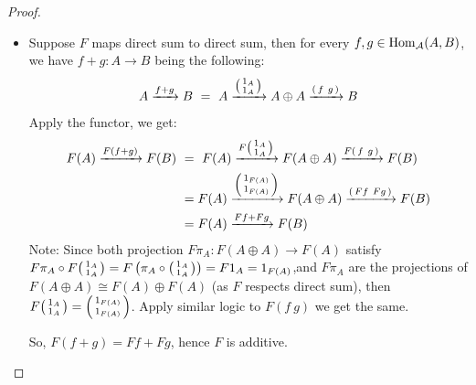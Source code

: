 \documentclass{article}
\begin{document}
\begin{proof}
\begin{itemize}
        \item[$\impliedby$:] Suppose $F$ maps direct sum to direct sum, then for every $f,g\in \mathrm{Hom}_\mathcal{A}(A,B)$, we have $f+g:A\rightarrow B$ being the following:
        \begin{align}
            A\xrightarrow{f+g}B\ =\ A\xrightarrow{
                \begin{psmallmatrix}
                    1_A\\1_A
                \end{psmallmatrix}
            }A\oplus A\xrightarrow{\begin{psmallmatrix}
                f\ g
            \end{psmallmatrix}
            }B
        \end{align}
        Apply the functor, we get:
        \begin{align}
            F(A)\xrightarrow{F(f+g)}F(B)\ &=\ F(A)\xrightarrow{F\begin{psmallmatrix}
                1_A\\1_A
            \end{psmallmatrix}
            }F(A\oplus A)\xrightarrow{F\begin{psmallmatrix}
                f\ g
            \end{psmallmatrix}
            }F(B)\\
            &= F(A)\xrightarrow{
                \begin{psmallmatrix}
                    1_{F(A)}\\1_{F(A)}
                \end{psmallmatrix}
            }F(A\oplus A)\xrightarrow{\begin{psmallmatrix}
                Ff\ Fg
            \end{psmallmatrix}
            }F(B)\\
            &= F(A)\xrightarrow{Ff+Fg}F(B)
        \end{align}
        Note: Since both projection $F\pi_A:F(A\oplus A)\rightarrow F(A)$ satisfy $F\pi_A\circ F\begin{psmallmatrix}
            1_A\\1_A
        \end{psmallmatrix}=F\left(\pi_A\circ\begin{psmallmatrix}
            1_A\\1_A
        \end{psmallmatrix}\right) = F 1_A = 1_{F(A)}$,and $F\pi_A$ are the projections of $F(A\oplus A)\cong F(A)\oplus F(A)$ (as $F$ respects direct sum), then $F\begin{psmallmatrix}
            1_A\\1_A
        \end{psmallmatrix} = \begin{psmallmatrix}
            1_{F(A)}\\1_{F(A)}
        \end{psmallmatrix}$. Apply similar logic to $F(f\ g)$ we get the same.

        So, $F(f+g) = Ff+Fg$, hence $F$ is additive.
    \end{itemize}
\end{proof}
\end{document}
